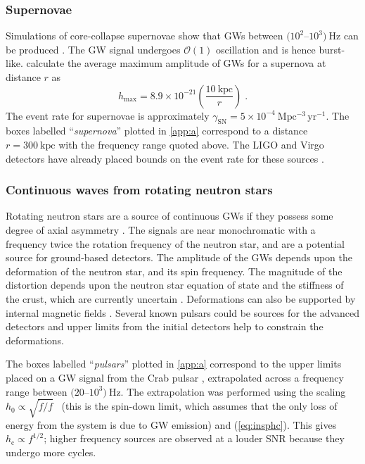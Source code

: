 \subsubsection{Supernovae}

Simulations of core-collapse supernovae show that GWs between $(10^{2}$--$10^{3})~\mathrm{Hz}$ can be produced \citep{Kotake2006}. The GW signal undergoes ${\mathcal{O}}(1)$ oscillation and is hence burst-like. \citet{2002A&A...393..523D} calculate the average maximum amplitude of GWs for a supernova at distance $r$ as
\begin{equation}
h_\mathrm{max} = 8.9\times 10^{-21}\left( \frac{10~\mathrm{kpc}}{r} \right) \; .
\end{equation}
The event rate for supernovae is approximately $\gamma_{\mathrm{SN}} = 5\times10^{-4}~\mathrm{Mpc^{-3}\,yr^{-1}}$. The boxes labelled ``\emph{supernova}'' plotted in \ref{app:a} correspond to a distance $r=300~\mathrm{kpc}$ with the frequency range quoted above. The LIGO and Virgo detectors have already placed bounds on the event rate for these sources \citep{Bursts}.

\subsubsection{Continuous waves from rotating neutron stars}

Rotating neutron stars are a source of continuous GWs if they possess some degree of axial asymmetry \citep{Abbott2007, Prix2009, Einstein@Home}. The signals are near monochromatic with a frequency twice the rotation frequency of the neutron star, and are a potential source for ground-based detectors. The amplitude of the GWs depends upon the deformation of the neutron star, and its spin frequency. The magnitude of the distortion depends upon the neutron star equation of state and the stiffness of the crust, which are currently uncertain \citep{Chamel2008,Lattimer2012}. Deformations can also be supported by internal magnetic fields \citep{Haskell2008}. Several known pulsars could be sources for the advanced detectors and upper limits from the initial detectors help to constrain the deformations. 

The boxes labelled ``\emph{pulsars}'' plotted in \ref{app:a} correspond to the upper limits placed on a GW signal from the Crab pulsar \citep{Aasi2014a}, extrapolated across a frequency range between $(20$--$10^{3})~\mathrm{Hz}$. The extrapolation was performed using the scaling $h_0 \propto \sqrt{\dot{f}/f}$~\citep{Aasi2014a} (this is the spin-down limit, which assumes that the only loss of energy from the system is due to GW emission) and (\ref{eq:insphc}). This gives $h_\mathrm{c} \propto f^{1/2}$; higher frequency sources are observed at a louder SNR because they undergo more cycles.

